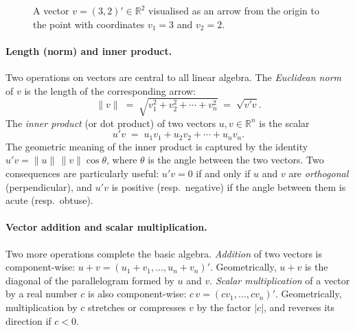\documentclass[11pt, a4paper, oneside]{article}
\begin{document}
\begin{figure}[H]
\centering
{}
\caption{A vector $v = (3, 2)' \in \mathbb{R}^2$ visualised as an
arrow from the origin to the point with coordinates $v_1 = 3$ and
$v_2 = 2$.}
\label{fig:vector-2d}
\end{figure}

\paragraph{Length (norm) and inner product.}
Two operations on vectors are central to all linear algebra. The
\emph{Euclidean norm} of $v$ is the length of the corresponding
arrow:
\[
\|v\| \;=\; \sqrt{v_1^2 + v_2^2 + \cdots + v_n^2} \;=\; \sqrt{v' v}.
\]
The \emph{inner product} (or dot product) of two vectors
$u, v \in \mathbb{R}^n$ is the scalar
\[
u' v \;=\; u_1 v_1 + u_2 v_2 + \cdots + u_n v_n.
\]
The geometric meaning of the inner product is captured by the
identity $u' v = \|u\| \, \|v\| \cos\theta$, where $\theta$ is the
angle between the two vectors. Two consequences are particularly
useful: $u' v = 0$ if and only if $u$ and $v$ are \emph{orthogonal}
(perpendicular), and $u' v$ is positive (resp.\ negative) if the
angle between them is acute (resp.\ obtuse).

\paragraph{Vector addition and scalar multiplication.}
Two more operations complete the basic algebra. \emph{Addition} of
two vectors is component-wise: $u + v = (u_1 + v_1, \ldots, u_n + v_n)'$.
Geometrically, $u + v$ is the diagonal of the parallelogram formed by
$u$ and $v$. \emph{Scalar multiplication} of a vector by a real
number $c$ is also component-wise: $c\, v = (c v_1, \ldots, c v_n)'$.
Geometrically, multiplication by $c$ stretches or compresses $v$ by
the factor $|c|$, and reverses its direction if $c < 0$.
\end{document}
